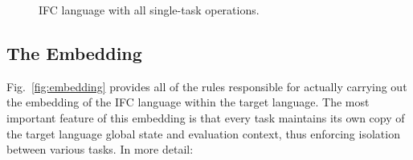 \documentclass{llncs}
\newcommand{\Varid}[1]{\mathit{#1}}
\begin{document}
\begin{figure}
\caption{IFC language with all single-task operations.}
\label{fig:ifc}
\end{figure}

\subsection{The Embedding}
Fig.~\ref{fig:embedding}
provides all of the rules responsible for actually carrying out the embedding of the IFC language within the target language.
The most important feature of this embedding is that every task maintains its own
copy of the target language global state and evaluation context, thus
enforcing isolation between various tasks.  In more detail:
\end{document}
